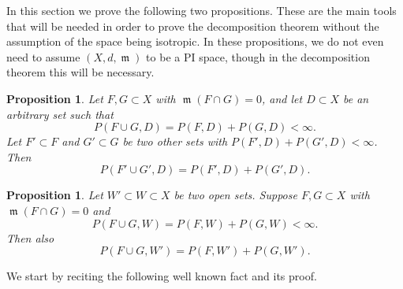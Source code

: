 \documentclass[11pt]{article}
\numberwithin{equation}{section}
\theoremstyle{plain}
\newtheorem{proposition}[equation]{Proposition}
\theoremstyle{definition}
\numberwithin{equation}{section}
\DeclareMathOperator{\frm}{\mathfrak{m}}
\begin{document}
In this section we prove the following two propositions. These are the main tools that will be needed
in order to prove the decomposition theorem without the assumption of the space being isotropic.
In these propositions, we do not even need to assume $(X,d,\frm)$ to be a PI space, though in the decomposition
theorem this will be necessary. 

\begin{proposition}\label{prop:main decomposition result}
	Let $F,G\subset X$ with $\frm(F\cap G)=0$,
	and let $D\subset X$ be an arbitrary set such that
	\[
	P(F\cup G,D)=P(F,D)+P(G,D)<\infty.
	\]
	Let $F'\subset F$ and $G'\subset G$ be two other sets
	with $P(F',D)+P(G',D)<\infty$.
	Then
	\[
	P(F'\cup G',D)=P(F',D)+P(G',D).
	\]
\end{proposition}

\begin{proposition}\label{prop:perimeter in small large set}
	Let $W'\subset W\subset X$ be two open sets.
	Suppose $F,G\subset X$ with $\frm(F\cap G)=0$ and
	\[
	P(F\cup G,W)=P(F,W)+P(G,W)<\infty.
	\]
	Then also
	\[
	P(F\cup G,W')=P(F,W')+P(G,W').
	\]
\end{proposition}

We start by reciting the following well known fact and its proof.
\end{document}
